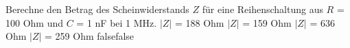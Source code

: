     {Berechne den Betrag des Scheinwiderstands $Z$ für eine Reihenschaltung aus $R$ = 100 Ohm und $C$ = 1 nF bei 1 MHz.}
    {$|Z|$ = 188 Ohm}
    {$|Z|$ = 159 Ohm}
    {$|Z|$ = 636 Ohm}
    {$|Z|$ = 259 Ohm}
    {false}{false}